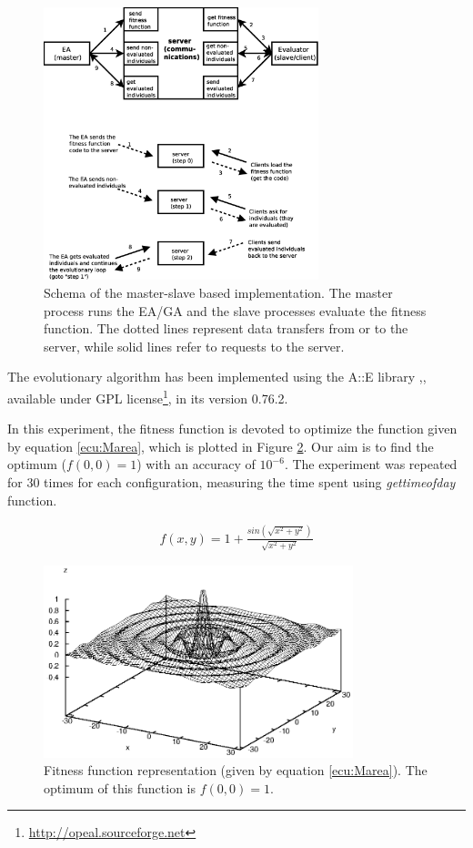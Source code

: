\documentclass[final,1p,times]{elsarticle}
\begin{document}
\begin{figure}[!ht]
\begin{center}
\includegraphics[width=8cm]{esquema.eps}
\caption{Schema of the master-slave based implementation. The master process runs the EA/GA and the slave processes evaluate the fitness function. The dotted lines represent data transfers from or to the server, while solid lines refer to requests to the server.} 
\label{fig:esquema}
\end{center}
\end{figure}


The evolutionary algorithm has been implemented using the A::E library
\cite{perl-ea},\cite{jjSOCO2010}, available under GPL
license\footnote{\url{http://opeal.sourceforge.net}}, in its version 0.76.2.

In this experiment, the fitness function is devoted to optimize the function given by equation \ref{ecu:Marea}, which is plotted in Figure \ref{fig:graficaMarea}. Our aim is to find the optimum ($f(0,0)=1$) with an accuracy of $10^{-6}$. 
The experiment was repeated for 30 times for each configuration, measuring the time spent using \emph{gettimeofday} function.

\begin{eqnarray}
f(x,y)=1+\frac{sin(\sqrt{x^{2}+y^{2}})}{\sqrt{x^{2}+y^{2}}} 
\label{ecu:Marea}
\end{eqnarray}

\begin{figure}[!ht]
\begin{center}
\includegraphics[width=9cm]{marea.eps}
\caption{Fitness function representation (given by equation \ref{ecu:Marea}). The optimum of this function is $f(0,0)=1$.}
\label{fig:graficaMarea}
\end{center}
\end{figure}
\end{document}
